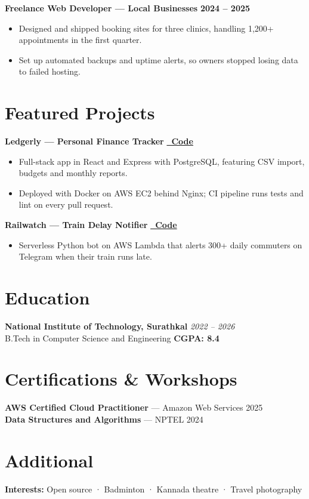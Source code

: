 \documentclass[a4paper,10pt]{article}
\newcommand{\resumeItemListStart}{\begin{itemize}[leftmargin=1.15em, itemsep=3pt, topsep=3pt, partopsep=0pt, parsep=0pt]}
\newcommand{\resumeItemListEnd}{\end{itemize}\vspace{5pt}}
\newcommand{\resumeEntryTitle}[2]{\textbf{#1} \hfill \textbf{#2} \\[-9pt]}
\begin{document}
\resumeEntryTitle{Freelance Web Developer — Local Businesses}{2024 – 2025}
\resumeItemListStart
  \item Designed and shipped booking sites for three clinics, handling 1,200+ appointments in the first quarter.
  \item Set up automated backups and uptime alerts, so owners stopped losing data to failed hosting.
\resumeItemListEnd


\section*{Featured Projects}
\resumeEntryTitle{Ledgerly — Personal Finance Tracker}{\href{https://github.com/prishapankaj}{\faGithub\ Code}}
\resumeItemListStart
  \item Full-stack app in React and Express with PostgreSQL, featuring CSV import, budgets and monthly reports.
  \item Deployed with Docker on AWS EC2 behind Nginx; CI pipeline runs tests and lint on every pull request.
\resumeItemListEnd

\resumeEntryTitle{Railwatch — Train Delay Notifier}{\href{https://github.com/prishapankaj}{\faGithub\ Code}}
\resumeItemListStart
  \item Serverless Python bot on AWS Lambda that alerts 300+ daily commuters on Telegram when their train runs late.
\resumeItemListEnd


\section*{Education}
\textbf{National Institute of Technology, Surathkal} \hfill \textit{2022 – 2026} \\
B.Tech in Computer Science and Engineering \hfill \textbf{CGPA: 8.4}


\section*{Certifications \& Workshops}
\textbf{AWS Certified Cloud Practitioner} — Amazon Web Services \hfill 2025 \\[5pt]
\textbf{Data Structures and Algorithms} — NPTEL \hfill 2024

\section*{Additional}
\textbf{Interests:} Open source · Badminton · Kannada theatre · Travel photography
\end{document}

